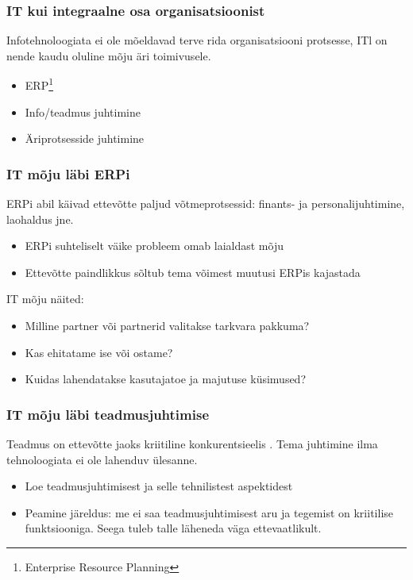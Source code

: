 \begin{frame}[fragile]
  \frametitle{IT kui integraalne osa organisatsioonist}
  Infotehnoloogiata ei ole mõeldavad terve rida organisatsiooni protsesse, ITl on nende kaudu oluline mõju äri toimivusele.
	\begin{itemize}
		\item ERP\footnote{Enterprise Resource Planning}
		\item Info/teadmus juhtimine
		\item Äriprotsesside juhtimine
	\end{itemize}
\end{frame}

\begin{frame}[fragile]
  \frametitle{IT mõju läbi {ERPi}}
  ERPi abil käivad ettevõtte paljud võtmeprotsessid: finants- ja personalijuhtimine, laohaldus jne. 
	\begin{itemize}
		\item ERPi suhteliselt väike probleem omab laialdast mõju
		\item Ettevõtte paindlikkus sõltub tema võimest muutusi ERPis kajastada
	\end{itemize}
  IT mõju näited:
	\begin{itemize}
		\item Milline partner või partnerid valitakse tarkvara pakkuma? 
		\item Kas ehitatame ise või ostame?
		\item Kuidas lahendatakse kasutajatoe ja majutuse küsimused? 
	\end{itemize}

\end{frame}

\begin{frame}[fragile]
  \frametitle{IT mõju läbi teadmusjuhtimise}
  Teadmus on ettevõtte jaoks kriitiline konkurentsieelis \citep{david2000diagnosing}. Tema juhtimine ilma tehnoloogiata ei ole lahenduv ülesanne. 
  	\begin{itemize}
		\item Loe teadmusjuhtimisest ja selle tehnilistest aspektidest \citep{15.905}
		\item Peamine järeldus: me ei saa teadmusjuhtimisest aru ja tegemist on kriitilise funktsiooniga. Seega tuleb talle läheneda väga ettevaatlikult.
	\end{itemize}
\end{frame}


